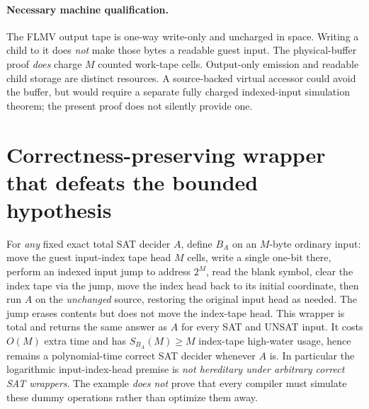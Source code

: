 \documentclass[11pt]{article}
\begin{document}
\paragraph{Necessary machine qualification.}
The FLMV output tape is one-way write-only and uncharged in space. Writing a child to it does \emph{not} make those bytes a readable guest input. The physical-buffer proof \emph{does} charge $M$ counted work-tape cells. Output-only emission and readable child storage are distinct resources. A source-backed virtual accessor could avoid the buffer, but would require a separate fully charged indexed-input simulation theorem; the present proof does not silently provide one.

\section{Correctness-preserving wrapper that defeats the bounded hypothesis}
For \emph{any} fixed exact total SAT decider $A$, define $B_A$ on an $M$-byte ordinary input: move the guest input-index tape head $M$ cells, write a single one-bit there, perform an indexed input jump to address $2^M$, read the blank symbol, clear the index tape via the jump, move the index head back to its initial coordinate, then run $A$ on the \emph{unchanged} source, restoring the original input head as needed. The jump erases contents but does not move the index-tape head. This wrapper is total and returns the same answer as $A$ for every SAT and UNSAT input. It costs $O(M)$ extra time and has $S_{B_A}(M)\ge M$ index-tape high-water usage, hence remains a polynomial-time correct SAT decider whenever $A$ is. In particular the logarithmic input-index-head premise is \emph{not hereditary under arbitrary correct SAT wrappers}. The example \emph{does not} prove that every compiler must simulate these dummy operations rather than optimize them away.
\end{document}
